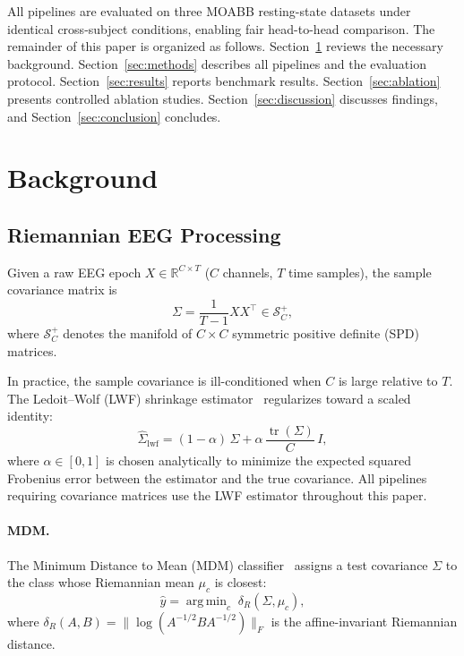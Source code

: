 \documentclass{article}
\newcommand{\tr}{\operatorname{tr}}
\DeclareMathOperator*{\argmin}{arg\,min}
\begin{document}
All pipelines are evaluated on three MOABB resting-state datasets under
identical cross-subject conditions, enabling fair head-to-head comparison.
The remainder of this paper is organized as follows.
Section~\ref{sec:background} reviews the necessary background.
Section~\ref{sec:methods} describes all pipelines and the evaluation protocol.
Section~\ref{sec:results} reports benchmark results.
Section~\ref{sec:ablation} presents controlled ablation studies.
Section~\ref{sec:discussion} discusses findings, and
Section~\ref{sec:conclusion} concludes.


\section{Background}
\label{sec:background}

\subsection{Riemannian EEG Processing}

Given a raw EEG epoch $X \in \mathbb{R}^{C \times T}$ ($C$ channels, $T$ time
samples), the sample covariance matrix is
\begin{equation}
  \Sigma = \frac{1}{T-1} X X^\top \in \mathcal{S}^{+}_C,
\end{equation}
where $\mathcal{S}^{+}_C$ denotes the manifold of $C\!\times\!C$ symmetric
positive definite (SPD) matrices.

In practice, the sample covariance is ill-conditioned when $C$ is large relative
to $T$.  The Ledoit--Wolf (LWF) shrinkage estimator~\cite{ledoit2004well} regularizes
toward a scaled identity:
\begin{equation}
  \hat\Sigma_{\text{lwf}} = (1-\alpha)\,\Sigma + \alpha\,\frac{\tr(\Sigma)}{C}\,I,
\end{equation}
where $\alpha \in [0,1]$ is chosen analytically to minimize the expected squared
Frobenius error between the estimator and the true covariance.  All pipelines
requiring covariance matrices use the LWF estimator throughout this paper.

\paragraph{MDM.}
The Minimum Distance to Mean (MDM) classifier~\cite{barachant2012multiclass}
assigns a test covariance $\Sigma$ to the class whose Riemannian mean $\mu_c$
is closest:
\begin{equation}
  \hat{y} = \argmin_c \; \delta_R(\Sigma, \mu_c),
\end{equation}
where $\delta_R(A,B)=\|\log(A^{-1/2}BA^{-1/2})\|_F$ is the affine-invariant
Riemannian distance.
\end{document}
